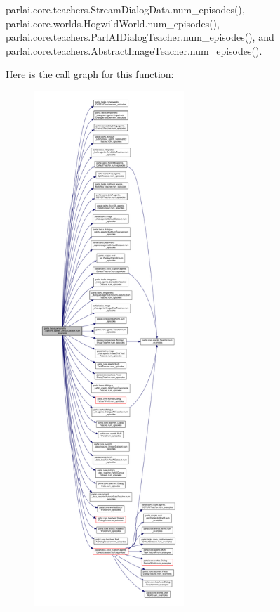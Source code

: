 parlai.\+core.\+teachers.\+Stream\+Dialog\+Data.\+num\+\_\+episodes(), parlai.\+core.\+worlds.\+Hogwild\+World.\+num\+\_\+episodes(), parlai.\+core.\+teachers.\+Parl\+A\+I\+Dialog\+Teacher.\+num\+\_\+episodes(), and parlai.\+core.\+teachers.\+Abstract\+Image\+Teacher.\+num\+\_\+episodes().

Here is the call graph for this function\+:
\nopagebreak
\begin{figure}[H]
\begin{center}
\leavevmode
\includegraphics[height=550pt]{classparlai_1_1tasks_1_1personality__captions_1_1agents_1_1DefaultDataset_a043423c38c701ceadd6fec7cf5168816_cgraph}
\end{center}
\end{figure}
\mbox{\label{classparlai_1_1tasks_1_1personality__captions_1_1agents_1_1DefaultDataset_a47fe8d505cb78e4da24426784b1ff376}} 
